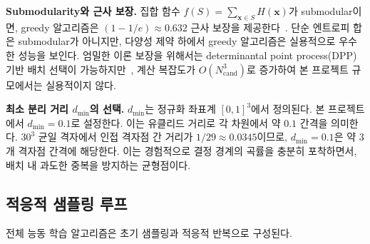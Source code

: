 \documentclass[11pt]{article}
\begin{document}
\textbf{Submodularity와 근사 보장.} 집합 함수 $f(S) = \sum_{\mathbf{x} \in S} H(\mathbf{x})$가 submodular이면, greedy 알고리즘은 $(1 - 1/e) \approx 0.632$ 근사 보장을 제공한다~\cite{Nemhauser1978}. 단순 엔트로피 합은 submodular가 아니지만, 다양성 제약 하에서 greedy 알고리즘은 실용적으로 우수한 성능을 보인다. 엄밀한 이론 보장을 위해서는 determinantal point process(DPP) 기반 배치 선택이 가능하지만~\cite{Krause2008}, 계산 복잡도가 $O(N_{\text{cand}}^3)$로 증가하여 본 프로젝트 규모에서는 실용적이지 않다.

\textbf{최소 분리 거리 $d_{\min}$의 선택.} $d_{\min}$는 정규화 좌표계 $[0,1]^3$에서 정의된다. 본 프로젝트에서 $d_{\min} = 0.1$로 설정한다. 이는 유클리드 거리로 각 차원에서 약 $0.1$ 간격을 의미한다. $30^3$ 균일 격자에서 인접 격자점 간 거리가 $1/29 \approx 0.0345$이므로, $d_{\min} = 0.1$은 약 3개 격자점 간격에 해당한다. 이는 경험적으로 결정 경계의 곡률을 충분히 포착하면서, 배치 내 과도한 중복을 방지하는 균형점이다.


\subsection{적응적 샘플링 루프}

전체 능동 학습 알고리즘은 초기 샘플링과 적응적 반복으로 구성된다.
\end{document}
